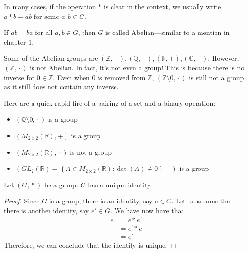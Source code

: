 \begin{remark}
    In many cases, if the operation \(*\) is clear in the context, we usually write \(a * b = ab\) for some \(a, b \in G\).
\end{remark}

\begin{remark}
    If \(ab = ba\) for all \(a, b \in G\), then \(G\) is called Abelian---similar to a mention in chapter 1.   
\end{remark}

\begin{nexample}
    Some of the Abelian groups are \((\mathbb{Z}, +), (\mathbb{Q}, +), (\mathbb{R}, +), (\mathbb{C}, +)\). However, \((\mathbb{Z}, {}\cdot{})\) is not Abelian. In fact, it's not even a group! This is because there is no inverse for \(0 \in \mathbb{Z}\). Even when 0 is removed from \(\mathbb{Z}\), \((\mathbb{Z} \setminus 0, {}\cdot{})\) is still not a group as it still does not contain any inverse.
\end{nexample}

\begin{nexample}
    Here are a quick rapid-fire of a pairing of a set and a binary operation:
    \begin{itemize}
        \item \((\mathbb{Q} \setminus 0, {}\cdot{})\) is a group
        \item \(\left(M_{2 \times 2}(\mathbb{R}), +\right)\) is a group
        \item \(\left(M_{2 \times 2}(\mathbb{R}), {}\cdot{}\right)\) is not a group
        \item \(\left(GL_2(\mathbb{R}) = \left\{A \in M_{2 \times 2}(\mathbb{R}) : \det(A) \neq 0\right\}, {}\cdot{}\right)\) is a group
    \end{itemize}
\end{nexample}

\begin{theorem}
    Let \((G, {}*{})\) be a group. \(G\) has a unique identity.
\end{theorem}

\begin{proof}
    Since \(G\) is a group, there is an identity, say \(e \in G\). Let us assume that there is another identity, say \(e' \in G\). We have now have that
    \[
    \begin{aligned}
        e &= e * e' \\
          &= e' * e \\
          &= e'
    \end{aligned}
    \]
    Therefore, we can conclude that the identity is unique.
\end{proof}

